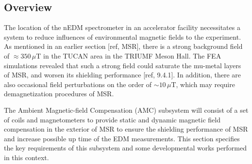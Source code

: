 \subsection{Overview}
The location of the nEDM spectrometer in an accelerator facility necessitates a system to reduce influences of environmental magnetic fields to the experiment. As mentioned in an earlier section [ref, MSR], there is a strong background field of $\approx 350\,\mu$T in the TUCAN area in the TRIUMF Meson Hall. The FEA simulations revealed that such a strong field could saturate the mu-metal layers of MSR, and worsen its shielding performance [ref, 9.4.1]. In addition, there are also occasional field perturbations on the order of $\sim 10\,\mu$T, which may require demagnetization procedures of MSR. 

The Ambient Magnetic-field Compensation (AMC) subsystem will consist of a set of coils and magnetometers to provide static and dynamic magnetic field compensation in the exterior of MSR to ensure the shielding performance of MSR and increase possible  up time of the EDM measurements. This section specifies the key requirements of this subsystem and some developmental works performed in this context.  

